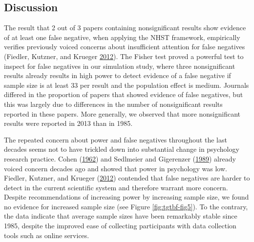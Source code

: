 \documentclass[a5paper]{book}
\begin{document}
\subsection{Discussion}\label{discussion-1}

The result that 2 out of 3 papers containing nonsignificant results show
evidence of at least one false negative, when applying the NHST
framework, empirically verifies previously voiced concerns about
insufficient attention for false negatives (Fiedler, Kutzner, and
Krueger \protect\hyperlink{ref-doi:10.1177ux2f1745691612462587}{2012}).
The Fisher test proved a powerful test to inspect for false negatives in
our simulation study, where three nonsignificant results already results
in high power to detect evidence of a false negative if sample size is
at least 33 per result and the population effect is medium. Journals
differed in the proportion of papers that showed evidence of false
negatives, but this was largely due to differences in the number of
nonsignificant results reported in these papers. More generally, we
observed that more nonsignificant results were reported in 2013 than in
1985.

The repeated concern about power and false negatives throughout the last
decades seems not to have trickled down into substantial change in
psychology research practice. Cohen
(\protect\hyperlink{ref-doi:10.1037ux2fh0045186}{1962}) and Sedlmeier
and Gigerenzer
(\protect\hyperlink{ref-doi:10.1037ux2f0033-2909.105.2.309}{1989})
already voiced concern decades ago and showed that power in psychology
was low. Fiedler, Kutzner, and Krueger
(\protect\hyperlink{ref-doi:10.1177ux2f1745691612462587}{2012})
contended that false negatives are harder to detect in the current
scientific system and therefore warrant more concern. Despite
recommendations of increasing power by increasing sample size, we found
no evidence for increased sample size (see Figure \ref{fig:tgtbf-fig5}).
To the contrary, the data indicate that average sample sizes have been
remarkably stable since 1985, despite the improved ease of collecting
participants with data collection tools such as online services.
\end{document}
